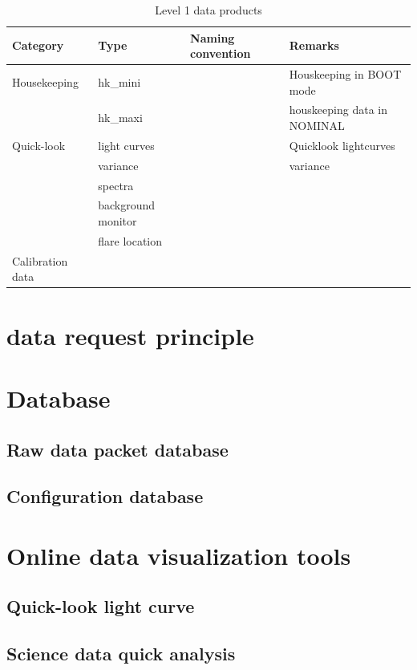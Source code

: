 \documentclass{aa}
\begin{document}
\begin{table}
\centering
\caption{Level 1 data products}
\begin{tabular}{llll}
Category & Type   &  Naming convention  & Remarks   \\ \hline
 Housekeeping & hk\_mini  &  & Houskeeping in BOOT mode   \\
 & hk\_maxi  &  & houskeeping data in NOMINAL   \\
 Quick-look &  light curves &  & Quicklook lightcurves \\
  &  variance &  & variance \\
  &  spectra &  &  \\
  &  background monitor &  &  \\
    &  flare location &  &  \\
 Calibration data &   &  &  \\
\end{tabular}
\end{table}
\section{data request principle}

\section{Database}
\subsection{Raw data packet database } 
\subsection{Configuration database}

\section{Online data visualization tools}
\subsection{Quick-look light curve}
\subsection{Science data quick analysis}
\end{document}
